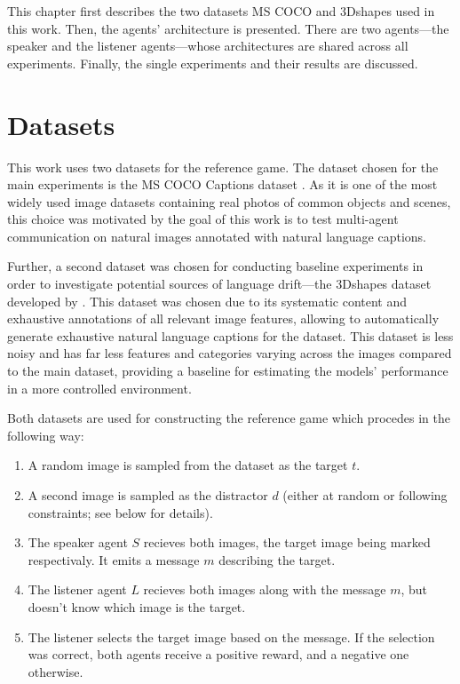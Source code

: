 This chapter first describes the two datasets MS COCO and 3Dshapes used in this work. Then, the agents' architecture is presented. There are two agents---the speaker and the listener agents---whose architectures are shared across all experiments. Finally, the single experiments and their results are discussed.

\section{Datasets}

This work uses two datasets for the reference game. The dataset chosen for the main experiments is the MS COCO Captions dataset \parencite{chen2015microsoft}. As it is one of the most widely used image datasets containing real photos of common objects and scenes, this choice was motivated by the goal of this work is to test multi-agent communication on natural images annotated with natural language captions. 

Further, a second dataset was chosen for conducting baseline experiments in order to investigate potential sources of language drift---the 3Dshapes dataset developed by \textcite{burgess20183d}. This dataset was chosen due to its systematic content and exhaustive annotations of all relevant image features, allowing to automatically generate exhaustive natural language captions for the dataset. This dataset is less noisy and has far less features and categories varying across the images compared to the main dataset, providing a baseline for estimating the models' performance in a more controlled environment.

Both datasets are used for constructing the reference game which procedes in the following way:
\begin{enumerate}
	\item A random image is sampled from the dataset as the target $t$.
	\item A second image is sampled as the distractor $d$ (either at random or following constraints; see below for details).
	\item The speaker agent $S$ recieves both images, the target image being marked respectivaly. It emits a message $m$ describing the target.
	\item The listener agent $L$ recieves both images along with the message $m$, but doesn't know which image is the target.
	\item The listener selects the target image based on the message. If the selection was correct, both agents receive a positive reward, and a negative one otherwise.	 
\end{enumerate}

